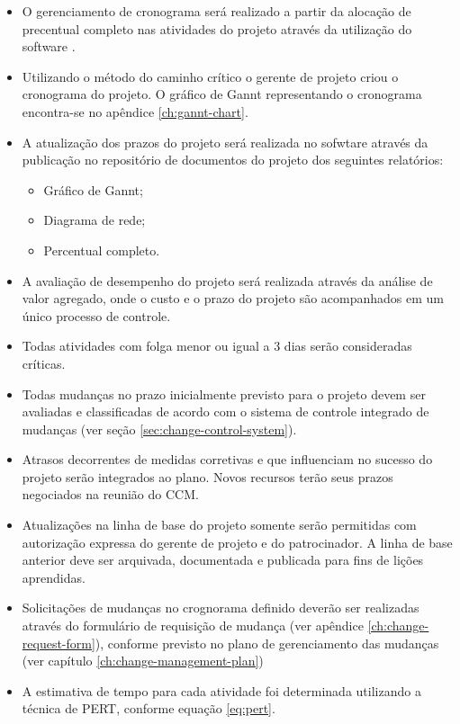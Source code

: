 \begin{itemize}
	\item O gerenciamento de cronograma será realizado a partir da alocação de precentual completo nas atividades do projeto através da utilização do software \projectManagementSoftwareName.
	\item Utilizando o método do caminho crítico o gerente de projeto criou o cronograma do projeto. O gráfico de Gannt representando o cronograma encontra-se no apêndice \ref{ch:gannt-chart}.
	\item A atualização dos prazos do projeto será realizada no sofwtare \projectManagementSoftwareName através da publicação no repositório de documentos do projeto dos seguintes relatórios:
	      \begin{itemize}
		      \item Gráfico de Gannt;
		      \item Diagrama de rede;
		      \item Percentual completo.
	      \end{itemize}
	\item A avaliação de desempenho do projeto será realizada através da análise de valor agregado, onde o custo e o prazo do projeto são acompanhados em um único processo de controle.
	\item Todas atividades com folga menor ou igual a 3 dias serão consideradas críticas.
	\item Todas mudanças no prazo inicialmente previsto para o projeto devem ser avaliadas e classificadas de acordo com o sistema de controle integrado de mudanças (ver seção \ref{sec:change-control-system}).
	\item Atrasos decorrentes de medidas corretivas e que influenciam no sucesso do projeto serão integrados ao plano. Novos recursos terão seus prazos negociados na reunião do CCM.
	\item Atualizações na linha de base do projeto somente serão permitidas com autorização expressa do gerente de projeto e do patrocinador. A linha de base anterior deve ser arquivada, documentada e publicada para fins de lições aprendidas.
	\item Solicitações de mudanças no crognorama definido deverão ser realizadas através do formulário de requisição de mudança (ver apêndice \ref{ch:change-request-form}), conforme previsto no plano de gerenciamento das mudanças (ver capítulo \ref{ch:change-management-plan})
	\item A estimativa de tempo para cada atividade foi determinada utilizando a técnica de PERT, conforme equação \ref{eq:pert}.


\end{itemize}
